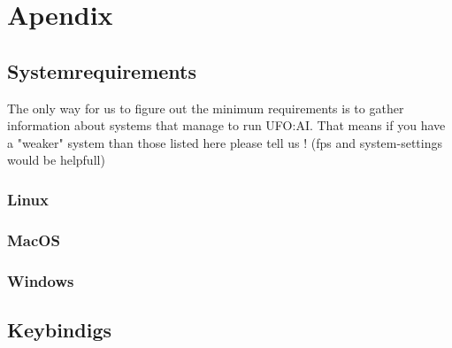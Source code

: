
%
%


\chapter{Apendix}

\section{Systemrequirements}
The only way for us to figure out the minimum requirements is to gather information about systems that manage to run UFO:AI. That means if you have a "weaker" system than those listed here please tell us ! (fps and system-settings would be helpfull)
\subsection{Linux}
\subsection{MacOS}
\subsection{Windows}

\section{Keybindigs}
